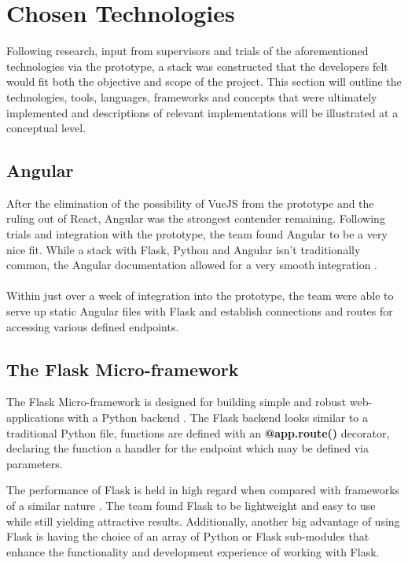 \section{Chosen Technologies}
Following research, input from supervisors and trials of the aforementioned technologies via the prototype, a stack was constructed that the developers felt would fit both the objective and scope of the project. This section will outline the technologies, tools, languages, frameworks and concepts that were ultimately implemented and descriptions of relevant implementations will be illustrated at a conceptual level.

\subsection{Angular}
After the elimination of the possibility of VueJS from the prototype and the ruling out of React, Angular was the strongest contender remaining. Following trials and integration with the prototype, the team found Angular to be a very nice fit. While a stack with Flask, Python and Angular isn't traditionally common, the Angular documentation allowed for a very smooth integration \cite{ANGULAR_DOCUMENTATION}.

\paragraph{}
Within just over a week of integration into the prototype, the team were able to serve up static Angular files with Flask and establish connections and routes for accessing various defined endpoints.

\subsection{The Flask Micro-framework}
The Flask Micro-framework is designed for building simple and robust web-applications with a Python backend \cite{FLASK}. The Flask backend looks similar to a traditional Python file, functions are defined with an \textbf{@app.route()} decorator, declaring the function a handler for the endpoint which may be defined via parameters.

The performance of Flask is held in high regard when compared with frameworks of a similar nature \cite{FLASK_USAGE}. The team found Flask to be lightweight and easy to use while still yielding attractive results. Additionally, another big advantage of using Flask is having the choice of an array of Python or Flask sub-modules that enhance the functionality and development experience of working with Flask. 

